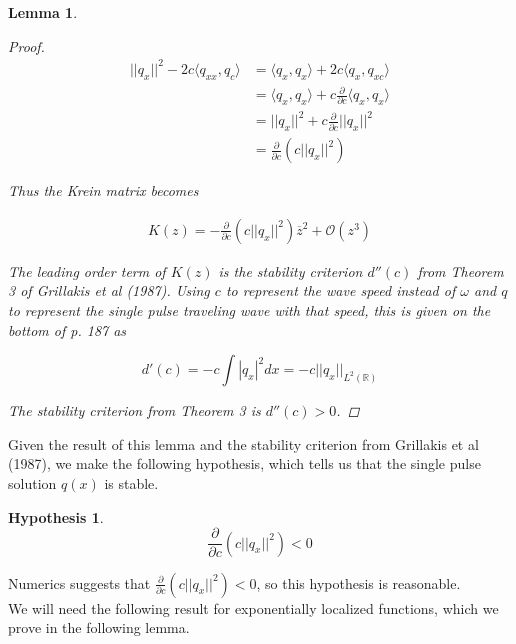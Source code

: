 \documentclass[12pt]{article}
\def\R{{\mathbb R}}
\newtheorem{lemma}{Lemma}
\newtheorem{hypothesis}{Hypothesis}
\begin{document}
\begin{lemma}
\begin{proof}
\begin{align*}
||q_x||^2 - 2c \langle q_{xx}, q_c \rangle &= \langle q_x, q_x \rangle + 2c \langle q_{x}, q_{xc} \rangle  \\
&= \langle q_x, q_x \rangle + c \frac{\partial}{\partial c}\langle q_x, q_x \rangle \\
&= ||q_x||^2 + c \frac{\partial}{\partial c}||q_x||^2 \\
&= \frac{\partial}{\partial c} \left( c||q_x||^2 \right)
\end{align*}

Thus the Krein matrix becomes 

\begin{align*}
K(z) = -\frac{\partial}{\partial c} \left( c||q_x||^2 \right) \overline{z}^2 + \mathcal{O}(z^3)
\end{align*}

The leading order term of $K(z)$ is the stability criterion $d''(c)$ from Theorem 3 of Grillakis et al (1987). Using $c$ to represent the wave speed instead of $\omega$ and $q$ to represent the single pulse traveling wave with that speed, this is given on the bottom of p. 187 as

\begin{equation}
d'(c) = -c \int |q_x|^2 dx = -c ||q_x||_{L^2(\R)}
\end{equation}

The stability criterion from Theorem 3 is $d''(c) > 0$. 
\end{proof}
\end{lemma}

Given the result of this lemma and the stability criterion from Grillakis et al (1987), we make the following hypothesis, which tells us that the single pulse solution $q(x)$ is stable.

\begin{hypothesis}
\begin{equation}\label{hypnonzero}
\frac{\partial}{\partial c} \left( c||q_x||^2 \right) < 0
\end{equation}
\end{hypothesis}

Numerics suggests that $\frac{\partial}{\partial c} \left( c||q_x||^2 \right) < 0$, so this hypothesis is reasonable. \\

We will need the following result for exponentially localized functions, which we prove in the following lemma.
\end{document}
